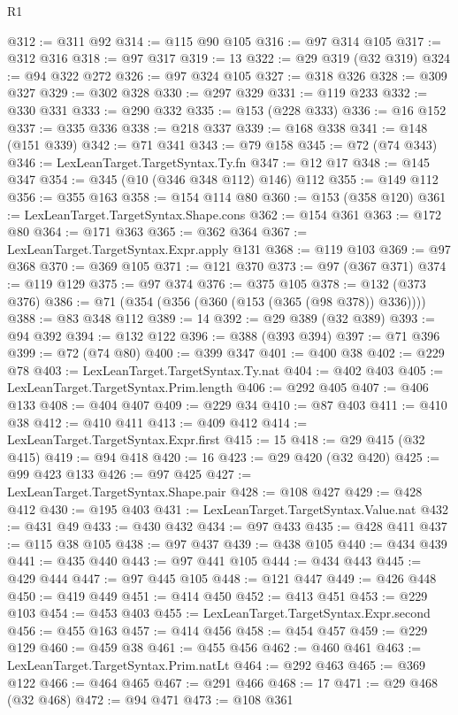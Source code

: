 \begin{lexlean}{R1}
\begin{coremodule}
{{{{{{{{{{{{{{{{{{{{{{{{{{{{{{{{{{{{{{{{{{{{{{{{{{{{{{{{{{{{{{{{{{{{{{{{{{{{{{{{{{{{{{{{{{{{{{{{{{{{{{{{{{{{{{{{{{{{{{{{{{{{{{{{{{{{{{{{{{{{{{{{{{{{{{{{{{{{{{{{{{{{{{{{{{{{{{{{{{{{{{{{{{@312 := @311 @92
@314 := @115 @90 @105
@316 := @97 @314 @105
@317 := @312 @316
@318 := @97 @317
@319 := 13
@322 := @29 @319 (@32 @319)
@324 := @94 @322 @272
@326 := @97 @324 @105
@327 := @318 @326
@328 := @309 @327
@329 := @302 @328
@330 := @297 @329
@331 := @119 @233
@332 := @330 @331
@333 := @290 @332
@335 := @153 (@228 @333)
@336 := @16 @152
@337 := @335 @336
@338 := @218 @337
@339 := @168 @338
@341 := @148 (@151 @339)
@342 := @71 @341
@343 := @79 @158
@345 := @72 (@74 @343)
@346 := LexLeanTarget.TargetSyntax.Ty.fn
@347 := @12 @17
@348 := @145 @347
@354 := @345 (@10 (@346 @348 @112) @146) @112
@355 := @149 @112
@356 := @355 @163
@358 := @154 @114 @80
@360 := @153 (@358 @120)
@361 := LexLeanTarget.TargetSyntax.Shape.cons
@362 := @154 @361
@363 := @172 @80
@364 := @171 @363
@365 := @362 @364
@367 := LexLeanTarget.TargetSyntax.Expr.apply @131
@368 := @119 @103
@369 := @97 @368
@370 := @369 @105
@371 := @121 @370
@373 := @97 (@367 @371)
@374 := @119 @129
@375 := @97 @374
@376 := @375 @105
@378 := @132 (@373 @376)
@386 := @71 (@354 (@356 (@360 (@153 (@365 (@98 @378)) @336))))
@388 := @83 @348 @112
@389 := 14
@392 := @29 @389 (@32 @389)
@393 := @94 @392
@394 := @132 @122
@396 := @388 (@393 @394)
@397 := @71 @396
@399 := @72 (@74 @80)
@400 := @399 @347
@401 := @400 @38
@402 := @229 @78
@403 := LexLeanTarget.TargetSyntax.Ty.nat
@404 := @402 @403
@405 := LexLeanTarget.TargetSyntax.Prim.length
@406 := @292 @405
@407 := @406 @133
@408 := @404 @407
@409 := @229 @34
@410 := @87 @403
@411 := @410 @38
@412 := @410 @411
@413 := @409 @412
@414 := LexLeanTarget.TargetSyntax.Expr.first
@415 := 15
@418 := @29 @415 (@32 @415)
@419 := @94 @418
@420 := 16
@423 := @29 @420 (@32 @420)
@425 := @99 @423 @133
@426 := @97 @425
@427 := LexLeanTarget.TargetSyntax.Shape.pair
@428 := @108 @427
@429 := @428 @412
@430 := @195 @403
@431 := LexLeanTarget.TargetSyntax.Value.nat
@432 := @431 @49
@433 := @430 @432
@434 := @97 @433
@435 := @428 @411
@437 := @115 @38 @105
@438 := @97 @437
@439 := @438 @105
@440 := @434 @439
@441 := @435 @440
@443 := @97 @441 @105
@444 := @434 @443
@445 := @429 @444
@447 := @97 @445 @105
@448 := @121 @447
@449 := @426 @448
@450 := @419 @449
@451 := @414 @450
@452 := @413 @451
@453 := @229 @103
@454 := @453 @403
@455 := LexLeanTarget.TargetSyntax.Expr.second
@456 := @455 @163
@457 := @414 @456
@458 := @454 @457
@459 := @229 @129
@460 := @459 @38
@461 := @455 @456
@462 := @460 @461
@463 := LexLeanTarget.TargetSyntax.Prim.natLt
@464 := @292 @463
@465 := @369 @122
@466 := @464 @465
@467 := @291 @466
@468 := 17
@471 := @29 @468 (@32 @468)
@472 := @94 @471
@473 := @108 @361
}}}}}}}}}}}}}}}}}}}}}}}}}}}}}}}}}}}}}}}}}}}}}}}}}}}}}}}}}}}}}}}}}}}}}}}}}}}}}}}}}}}}}}}}}}}}}}}}}}}}}}}}}}}}}}}}}}}}}}}}}}}}}}}}}}}}}}}}}}}}}}}}}}}}}}}}}}}}}}}}}}}}}}}}}}}}}}}}}}}}}}}}}}
\end{coremodule}
\end{lexlean}
